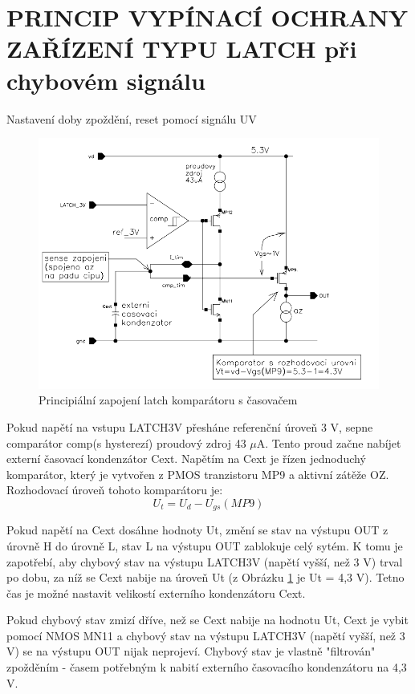 \section{PRINCIP VYPÍNACÍ OCHRANY ZAŘÍZENÍ TYPU LATCH při chybovém signálu}
Nastavení doby zpoždění, reset pomocí signálu UV

\begin{figure}[h]
   \begin{center}
     \includegraphics[scale=0.5]{images/Latch.png}
   \end{center}
   \caption{Principiální zapojení latch komparátoru s časovačem}
   \label{Latch}
\end{figure}

Pokud napětí na vstupu LATCH3V přesháne referenční úroveň 3 V, sepne comparátor comp(s hysterezí) proudový zdroj 43 $\mu$A. Tento proud začne nabíjet externí časovací kondenzátor Cext. Napětím na Cext je řízen jednoduchý komparátor, který je vytvořen z PMOS tranzistoru MP9 a aktivní zátěže OZ. Rozhodovací úroveň tohoto komparátoru je:
\begin{equation}
U_{t} = U_{d}-U_{gs}(MP9)
\end{equation}

Pokud napětí na Cext dosáhne hodnoty Ut, změní se stav na výstupu OUT z úrovně H do úrovně L, stav L na výstupu OUT zablokuje celý sytém. K tomu je zapotřebí, aby chybový stav na výstupu LATCH3V (napětí vyšší, než 3 V) trval po dobu, za níž se Cext nabije na úroveň Ut (z Obrázku \ref{Latch} je Ut = 4,3 V). Tetno čas je možné nastavit velikostí externího kondenzátoru Cext.

Pokud chybový stav zmizí dříve, než se Cext nabije na hodnotu Ut, Cext je vybit pomocí NMOS MN11 a chybový stav na výstupu LATCH3V (napětí vyšší, než 3 V) se na výstupu OUT nijak neprojeví. Chybový stav je vlastně "filtrován" zpožděním - časem potřebným k nabití externího časovacího kondenzátoru na 4,3 V.

